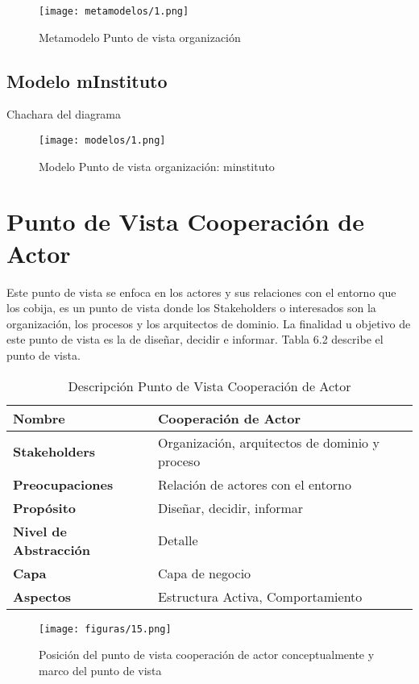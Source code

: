  \begin{figure}[!h]
   \centering
   \texttt{[image: metamodelos/1.png]}
   \captionsetup{width=.95\textwidth}
   \caption{Metamodelo Punto de vista organización}
   \label{metamodelo1}
 \end{figure}

 \subsection{Modelo mInstituto}Chachara del diagrama
  \begin{figure}[!h]
   \centering
   \texttt{[image: modelos/1.png]}
   \captionsetup{width=.95\textwidth}
   \caption{Modelo Punto de vista organización: minstituto}
   \label{modelo1}
  \end{figure}
  
  \section{Punto de Vista Cooperación de Actor}
  Este punto de vista se enfoca en los actores y sus relaciones con el entorno que los cobija, es un punto de vista donde los Stakeholders o interesados son la organización, los procesos y los arquitectos de dominio. La finalidad u objetivo de este punto de vista es la de diseñar, decidir e informar. Tabla 6.2 describe el punto de vista.
  
  \begin{table}[!h]
  	\centering
  	\begin{tabular}{lp{8cm}}
  		\toprule
  		\textbf{Nombre} & \textbf{Cooperación de Actor} \\
  		\midrule
  		\textbf{Stakeholders} & Organización, arquitectos de dominio y proceso \\
  		\textbf{Preocupaciones} & Relación de actores con el entorno \\
  		\textbf{Propósito} & Diseñar, decidir, informar \\
  		\textbf{Nivel de Abstracción} & Detalle \\
  		\textbf{Capa} & Capa de negocio \\
  		\textbf{Aspectos} & Estructura Activa, Comportamiento \\
  		\bottomrule
  	\end{tabular}
  	\captionsetup{width=.95\textwidth}
  	\caption{Descripción Punto de Vista Cooperación de Actor}
  	\label{tabla5}
  \end{table}
  
   \begin{figure}[!h]
   	\centering
   	\texttt{[image: figuras/15.png]}
   	\captionsetup{width=.95\textwidth}
   	\caption{Posición del punto de vista cooperación de actor conceptualmente y marco del punto de vista}
   	\label{figura15}
   \end{figure}
  
